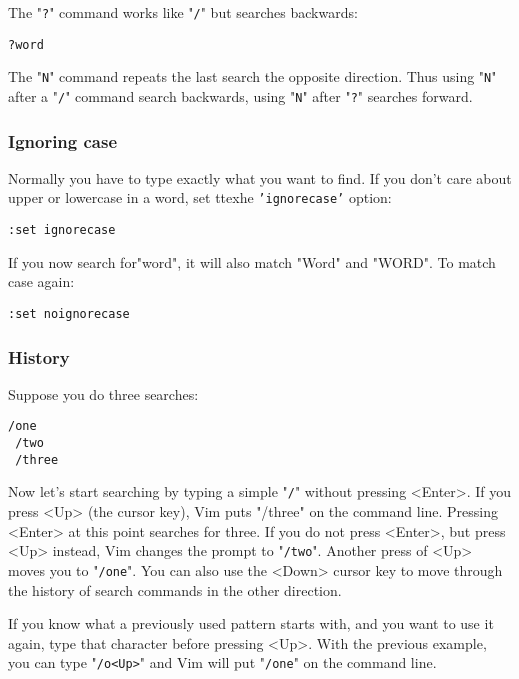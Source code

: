 The "\texttt{?}" command works like "\texttt{/}" but searches backwards:

 \begin{Verbatim}[samepage=true]
 ?word
 \end{Verbatim}

The "\texttt{N}" command repeats the last search the opposite direction.
Thus using "\texttt{N}" after a "\texttt{/}" command search backwards, using "\texttt{N}" after "\texttt{?}" searches forward.

\subsubsection{Ignoring case}

Normally you have to type exactly what you want to find.
If you don't care about upper or lowercase in a word, set ttexhe \texttt{'ignorecase'} option:

 \begin{Verbatim}[samepage=true]
 :set ignorecase
 \end{Verbatim}

If you now search for"word", it will also match "Word" and "WORD".
To match case again:

 \begin{Verbatim}[samepage=true]
 :set noignorecase
 \end{Verbatim}

\subsubsection{History}

Suppose you do three searches:

 \begin{Verbatim}[samepage=true]
 /one
 /two
 /three
 \end{Verbatim}

Now let's start searching by typing a simple "\texttt{/}" without pressing <Enter>.
If you press <Up> (the cursor key), Vim puts "/three" on the command line.
Pressing <Enter> at this point searches for three.
If you do not press <Enter>, but press <Up> instead, Vim changes the prompt to "\texttt{/two}".
Another press of <Up> moves you to "\texttt{/one}".
You can also use the <Down> cursor key to move through the history of search commands in the other direction.

If you know what a previously used pattern starts with, and you want to use it again, type that character before pressing <Up>.
With the previous example, you can type "\texttt{/o<Up>}" and Vim will put "\texttt{/one}" on the command line.

